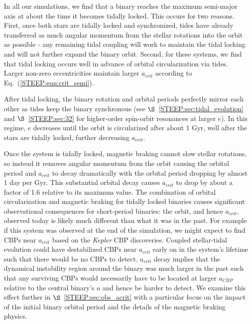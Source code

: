 In all our simulations, we find that a binary reaches the maximum semi-major axis at about the time it becomes tidally locked.  This occurs for two reasons.  First, once both stars are tidally locked and synchronized, tides have already transferred as much angular momentum from the stellar rotations into the orbit as possible - any remaining tidal coupling will work to maintain the tidal locking and will not further expand the binary orbit.  Second, for these systems, we find that tidal locking occurs well in advance of orbital circularization via tides.  Larger non-zero eccentricities maintain larger $a_{crit}$ according to Eq.~(\ref{STEEP:eqn:crit_semi}). 

After tidal locking, the binary rotation and orbital periods perfectly mirror each other as tides keep the binary synchronous (see $\S$~\ref{STEEP:sec:tidal_evolution} and $\S$~\ref{STEEP:sec:32} for higher-order spin-orbit resonances at larger $e$).  In this regime, $e$ decreases until the orbit is circularized after about 1 Gyr, well after the stars are tidally locked, further decreasing $a_{crit}$.

Once the system is tidally locked, magnetic braking cannot slow stellar rotations, so instead it removes angular momentum from the orbit causing the orbital period and $a_{crit}$ to decay dramatically with the orbital period dropping by almost 1 day per Gyr.  This substantial orbital decay causes $a_{crit}$ to drop by about a factor of 1.6 relative to its maximum value.  The combination of orbital circularization and magnetic braking for tidally locked binaries causes significant observational consequences for short-period binaries: the orbit, and hence $a_{crit}$, observed today is likely much different than what it was in the past.  For example if this system was observed at the end of the simulation, we might expect to find CBPs near $a_{crit}$ based on the {\it Kepler} CBP discoveries.  Coupled stellar-tidal evolution could have destabilized CBPs near $a_{crit}$ early on in the system's lifetime such that there would be no CBPs to detect.  $a_{crit}$ decay implies that the dynamical instability region around the binary was much larger in the past such that any surviving CBPs would necessarily have to be located at larger $a_{CBP}$ relative to the central binary's $a$ and hence be harder to detect.  We examine this effect further in $\S$~\ref{STEEP:sec:obs_acrit} with a particular focus on the impact of the initial binary orbital period and the details of the magnetic braking physics.

